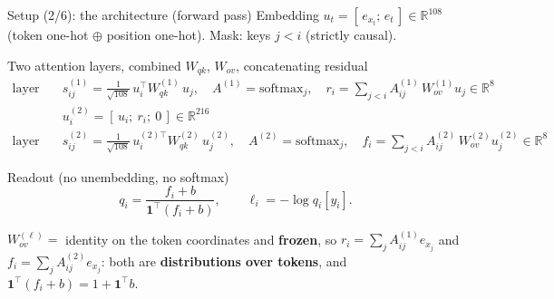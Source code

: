 \documentclass[aspectratio=169,11pt]{beamer}
\newcommand{\1}{\mathbf{1}}
\begin{document}
\begin{frame}{Setup (2/6): the architecture (forward pass)}
\small
Embedding $u_t=[\,e_{x_t};\,e_t\,]\in\mathbb R^{108}$ (token one-hot $\oplus$ position one-hot). Mask: keys $j<i$ (strictly causal).
\begin{block}{Two attention layers, combined $W_{qk}$, $W_{ov}$, concatenating residual}
\vspace{-0.5em}
\begin{align*}
\text{layer 1:}\quad & s^{(1)}_{ij}=\tfrac{1}{\sqrt{108}}\,u_i^\top W^{(1)}_{qk}\,u_j,\quad
A^{(1)}=\mathrm{softmax}_j,\quad r_i=\textstyle\sum_{j<i}A^{(1)}_{ij}\,W^{(1)}_{ov}u_j\in\mathbb R^{8}\\
& u^{(2)}_i=[\,u_i;\ r_i;\ 0\,]\in\mathbb R^{216}\\
\text{layer 2:}\quad & s^{(2)}_{ij}=\tfrac{1}{\sqrt{108}}\,u^{(2)\top}_i W^{(2)}_{qk}\,u^{(2)}_j,\quad
A^{(2)}=\mathrm{softmax}_j,\quad f_i=\textstyle\sum_{j<i}A^{(2)}_{ij}\,W^{(2)}_{ov}u^{(2)}_j\in\mathbb R^{8}
\end{align*}
\end{block}
\begin{block}{Readout (no unembedding, no softmax)}
\vspace{-0.5em}
\[
q_i=\frac{f_i+b}{\1^\top(f_i+b)},\qquad \ell_i=-\log q_i[y_i].
\]
\end{block}
$W^{(\ell)}_{ov}=$ identity on the token coordinates and \textbf{frozen}, so $r_i=\sum_jA^{(1)}_{ij}e_{x_j}$ and
$f_i=\sum_jA^{(2)}_{ij}e_{x_j}$: both are \textbf{distributions over tokens}, and $\1^\top(f_i+b)=1+\1^\top b$.
\end{frame}
\end{document}
